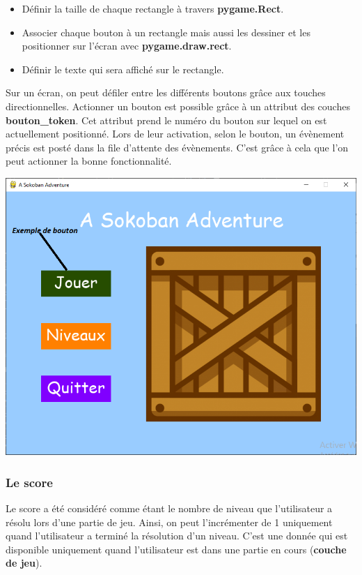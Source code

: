 \documentclass[a4paper,12pt]{article} %
\begin{document}
\begin{itemize}
	\item Définir la taille de chaque rectangle à travers  \textbf{pygame.Rect}.
	\item Associer chaque bouton à un rectangle mais aussi les dessiner et les positionner sur l’écran avec \textbf{pygame.draw.rect}.
	\item Définir le texte qui sera affiché sur le rectangle.
\end{itemize}
Sur un écran, on peut défiler entre les différents boutons grâce aux touches directionnelles. Actionner un bouton est possible grâce à un attribut des couches \textbf{bouton\_token}.
Cet attribut prend le numéro du bouton sur lequel on est actuellement positionné. Lors de leur activation, selon le bouton, un évènement précis est posté dans la file d'attente des évènements. C'est grâce à cela que l'on peut actionner la bonne fonctionnalité.
\begin{center}
	\includegraphics[scale=0.4]{images/Capture_133201.png}
\end{center}

\subsubsection{Le score} 

Le score a été considéré comme étant le nombre de niveau que l'utilisateur a résolu lors d'une partie de jeu. Ainsi, on peut l’incrémenter de 1 uniquement quand l'utilisateur a terminé la résolution d'un niveau. C'est une donnée qui est disponible uniquement quand l'utilisateur est dans une partie en cours (\textbf{couche de jeu}).
\end{document}
